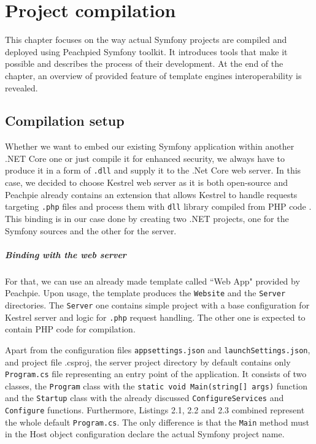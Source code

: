 \chapter{Project compilation}
This chapter focuses on the way actual Symfony projects are compiled and deployed using Peachpied Symfony toolkit. It introduces tools that make it possible and describes the process of their development. At the end of the chapter, an overview of provided feature of template engines interoperability is revealed.

\section{Compilation setup}
Whether we want to embed our existing Symfony application within another
 .NET Core one or just compile it for enhanced security, we always have to produce it in a form of \texttt{.dll} and supply it to the .Net Core web server. In this case, we decided to choose Kestrel web server as it is both open-source and Peachpie already contains an extension that allows Kestrel to handle requests targeting \texttt{.php} files and process them with \texttt{dll} library compiled from PHP code \citep{Peachpie}. This binding is in our case done by creating two .NET projects, one for the Symfony sources and the other for the server.

\paragraph{Binding with the web server} For that, we can use an already made template called ``Web App" provided by Peachpie. Upon usage, the template produces the \texttt{Website} and the \texttt{Server} directories. The \texttt{Server} one contains simple project with a base configuration for Kestrel server and logic for \texttt{.php} request handling. The other one is expected to contain PHP code for compilation.

Apart from the configuration files \texttt{appsettings.json} and \texttt{launchSettings.json}, and project file .csproj, the server project directory by default contains only \texttt{Program.cs} file representing an entry point of the application. It consists of two classes, the \texttt{Program} class with the \texttt{static void Main(string[] args)} function and the \texttt{Startup} class with the already discussed \texttt{ConfigureServices} and \texttt{Configure} functions. Furthermore, Listings 2.1, 2.2 and 2.3 combined represent the whole default \texttt{Program.cs}. The only difference is that the \texttt{Main} method must in the Host object configuration declare the actual Symfony project name.

